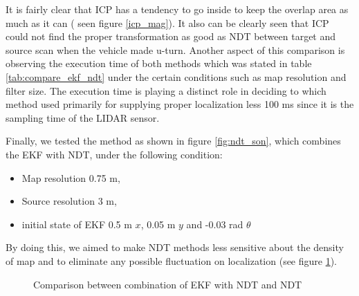 It is fairly clear that ICP has a tendency to go inside to keep the overlap area as much as it can ( seen figure \ref{icp_mag}). It also can be clearly seen that ICP could not find the proper transformation as good as NDT between target and source scan when the vehicle made u-turn. Another aspect of this comparison is observing the execution time of both methods which was stated in table \ref{tab:compare_ekf_ndt} under the certain conditions such as map resolution and filter size. The execution time is playing a distinct role in deciding to which method used primarily for supplying proper localization less 100 ms since it is the sampling time of the LIDAR sensor.

\newpage
\par Finally, we tested the method as shown in figure \ref{fig:ndt_son}, which combines the EKF with NDT, under the following condition:
\begin{itemize}
    \item Map resolution 0.75 m,
    \item Source resolution 3 m,
    \item initial state of EKF 0.5 m $x$, 0.05 m $y$ and -0.03 rad $\theta$
\end{itemize}
By doing this, we aimed to make NDT methods less sensitive about the density of map and to eliminate any possible fluctuation on localization (see figure \ref{fig:ekf_ndt_vs_ndt}).

\begin{figure}[H]
\centering
{}
\end{figure}
\vspace{-0.5cm}
\begin{figure}[H]
\caption{Comparison between combination of EKF with NDT and NDT}
\label{fig:ekf_ndt_vs_ndt}
\end{figure}

